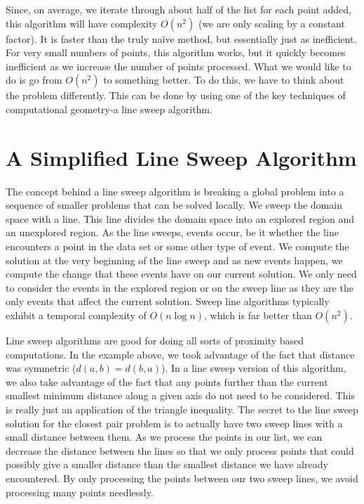 Since, on average, we iterate through about half of the list for each point added, this algorithm will have complexity $O(n^2)$ (we are only scaling by a constant factor).  
It is faster than the truly na\"ive method, but essentially just as inefficient.
For very small numbers of points, this algorithm works, but it quickly becomes inefficient as we increase the number of points processed.  
What we would like to do is go from $O(n^2)$ to something better.  
To do this, we have to think about the problem differently.
This can be done by using one of the key techniques of computational geometry-a line sweep algorithm.

\section*{A Simplified Line Sweep Algorithm}

The concept behind a line sweep algorithm is breaking a global problem into a sequence of smaller problems that can be solved locally.
We sweep the domain space with a line.
This line divides the domain space into an explored region and an unexplored region.
As the line sweeps, events occur, be it whether the line encounters a point in the data set
or some other type of event.  
We compute the solution at the very beginning of the line sweep and as new events happen, we compute the change that these events have on our current solution.
We only need to consider the events in the explored region or on the sweep line as they are the only events that affect the current solution.  
Sweep line algorithms typically exhibit a temporal complexity of $O(n \log n)$, which is far better than $O(n^2)$.

Line sweep algorithms are good for doing all sorts of proximity based computations.
In the example above, we took advantage of the fact that distance was symmetric ($d(a,b)=d(b,a)$).
In a line sweep version of this algorithm, we also take advantage of the fact that any points further than the current smallest minimum distance along a given axis do not need to be considered.
This is really just an application of the triangle inequality.
The secret to the line sweep solution for the closest pair problem is to actually have two sweep lines with a small distance between them.
As we process the points in our list, we can decrease the distance between the lines so that we only process points that could possibly give a smaller distance than the smallest distance we have already encountered.
By only processing the points between our two sweep lines, we avoid processing many points needlessly.

